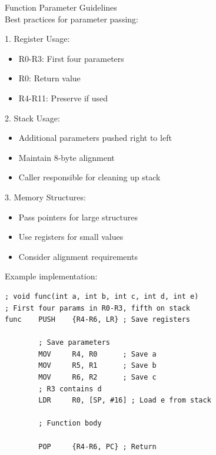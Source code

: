 \begin{KR}{Function Parameter Guidelines}\\
Best practices for parameter passing:

1. Register Usage:
\begin{itemize}
  \item R0-R3: First four parameters
  \item R0: Return value
  \item R4-R11: Preserve if used
\end{itemize}

2. Stack Usage:
\begin{itemize}
  \item Additional parameters pushed right to left
  \item Maintain 8-byte alignment
  \item Caller responsible for cleaning up stack
\end{itemize}

3. Memory Structures:
\begin{itemize}
  \item Pass pointers for large structures
  \item Use registers for small values
  \item Consider alignment requirements
\end{itemize}

Example implementation:
\begin{lstlisting}[language=armasm, style=basesmol]
; void func(int a, int b, int c, int d, int e)
; First four params in R0-R3, fifth on stack
func    PUSH    {R4-R6, LR} ; Save registers
        
        ; Save parameters
        MOV     R4, R0      ; Save a
        MOV     R5, R1      ; Save b
        MOV     R6, R2      ; Save c
        ; R3 contains d
        LDR     R0, [SP, #16] ; Load e from stack
        
        ; Function body
        
        POP     {R4-R6, PC} ; Return
\end{lstlisting}
\end{KR}

